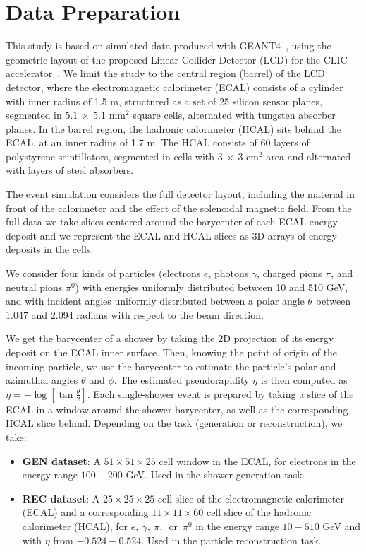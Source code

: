 \chapter{Data Preparation}\label{sec:data}

This study is based on simulated data produced with GEANT4~\cite{GEANT4}, using the geometric layout of the proposed Linear Collider Detector (LCD) for the CLIC accelerator~\cite{Lebrun:2012hj}. We limit the study to the central region (barrel) of the LCD detector, where the electromagnetic calorimeter (ECAL) consists of a cylinder with inner radius of 1.5 m, structured as a set of 25 silicon sensor planes, segmented in $5.1~\times~5.1$ mm$^2$ square cells, alternated with tungsten absorber planes. In the barrel region, the hadronic calorimeter (HCAL) sits behind the ECAL, at an inner radius of 1.7 m. The HCAL 
consists of 60 layers of polystyrene scintillators, segmented in cells with  $3~\times~3$ cm$^2$ area and alternated with layers of steel absorbers. 

The event simulation considers the full detector layout, including the material in front of the calorimeter and the effect of the solenoidal magnetic field. From the full data we take slices centered around the barycenter of each ECAL energy deposit and we represent the ECAL and HCAL slices as 3D arrays of energy deposits in the cells. 

We consider four kinds of particles (electrons $e$, photons $\gamma$, charged pions $\pi$, and neutral pions $\pi^0$) with energies uniformly distributed between 10 and 510 GeV, and with incident angles uniformly distributed between a polar angle $\theta$ between 1.047 and 2.094 radians with respect to the beam direction.

We get the barycenter of a shower by taking the 2D projection of its energy deposit on the ECAL inner surface. Then, knowing the point of origin of the incoming particle, we use the barycenter to estimate the particle's polar and azimuthal angles $\theta$ and $\phi$. The estimated pseudorapidity $\eta$ is then computed as $\eta=-\log[\tan\frac{\theta}{2}]$. Each single-shower event is prepared by taking a slice of the ECAL in a window around the shower barycenter, as well as the corresponding HCAL slice behind. Depending on the task (generation or reconstruction), we take:
\begin{itemize}
  \item {\bf GEN dataset}: A $51 \times 51 \times 25$ cell window in the
    ECAL, for electrons in the energy range $100-200$ GeV. Used in the shower generation task.
  \item {\bf REC dataset}: A $25 \times
    25 \times 25$ cell slice of the electromagnetic calorimeter (ECAL)
    and a corresponding $11 \times 11 \times 60$ cell slice of the
    hadronic calorimeter (HCAL), for $e,~\gamma,~\pi,$~or~$\pi^0$ in the energy range $10-510$ GeV and with $\eta$ from $-0.524-0.524$. Used in the particle reconstruction task.
\end{itemize}

